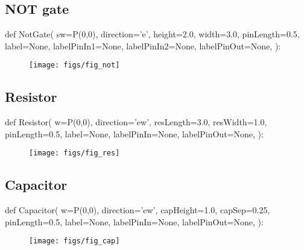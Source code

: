 \subsection{NOT gate}
\label{func:electronicsNot}
\begin{python}
def NotGate(
        sw=P(0,0),
        direction='e',
        height=2.0,
        width=3.0,
        pinLength=0.5,
        label=None,
        labelPinIn1=None,
        labelPinIn2=None,
        labelPinOut=None,
        ):
\end{python}

\begin{figure}[!h]
\centerline{\texttt{[image: figs/fig\_not]}}
\end{figure}

\subsection{Resistor}
\label{func:electronicsResistor}
\begin{python}
def Resistor(
        w=P(0,0),
        direction='ew',
        resLength=3.0,
        resWidth=1.0,
        pinLength=0.5,
        label=None,
        labelPinIn=None,
        labelPinOut=None,
        ):
\end{python}

\begin{figure}[!h]
\centerline{\texttt{[image: figs/fig\_res]}}
\end{figure}

\subsection{Capacitor}
\label{func:electronicsCapacitor}
\begin{python}
def Capacitor(
        w=P(0,0),
        direction='ew',
        capHeight=1.0,
        capSep=0.25,
        pinLength=0.5,
        label=None,
        labelPinIn=None,
        labelPinOut=None,
        ):
\end{python}

\begin{figure}[!h]
\centerline{\texttt{[image: figs/fig\_cap]}}
\end{figure}


